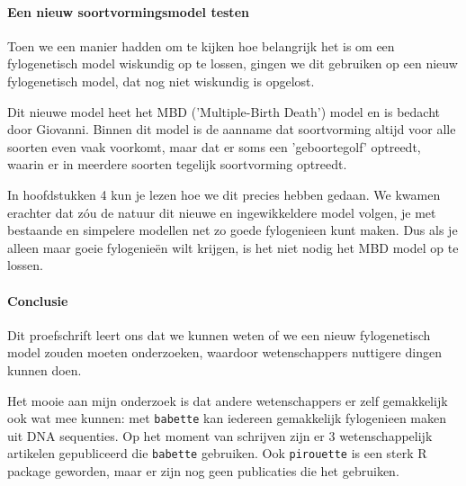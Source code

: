 {\paragraph{Een nieuw soortvormingsmodel testen}

Toen we een manier hadden om te kijken hoe belangrijk het is om
een fylogenetisch model wiskundig op te lossen, gingen
we dit gebruiken op een nieuw fylogenetisch model,
dat nog niet wiskundig is opgelost.

Dit nieuwe model heet het MBD ('Multiple-Birth Death') model
en is bedacht door Giovanni.
Binnen dit model is de aanname dat soortvorming altijd voor
alle soorten even vaak voorkomt, maar dat er soms een 
'geboortegolf' optreedt, waarin er in meerdere soorten tegelijk 
soortvorming optreedt. 

In hoofdstukken 4 kun je lezen hoe we dit precies hebben gedaan.
We kwamen erachter dat zóu de natuur dit nieuwe en ingewikkeldere model
volgen, je met bestaande en simpelere modellen net zo goede
fylogenieen kunt maken. Dus als je alleen maar goeie fylogenieën wilt krijgen,
is het niet nodig het MBD model op te lossen.

\paragraph{Conclusie}

Dit proefschrift leert ons dat we kunnen weten of we een nieuw fylogenetisch
model zouden moeten onderzoeken, waardoor wetenschappers 
nuttigere dingen kunnen doen.

Het mooie aan mijn onderzoek is dat andere wetenschappers er zelf gemakkelijk 
ook wat mee kunnen:
met \verb;babette; kan iedereen gemakkelijk fylogenieen maken uit DNA
sequenties. Op het moment van schrijven zijn er 3 wetenschappelijk artikelen
gepubliceerd die \verb;babette; gebruiken.
Ook \verb;pirouette; is een sterk R package geworden, maar er zijn
nog geen publicaties die het gebruiken.

} %
